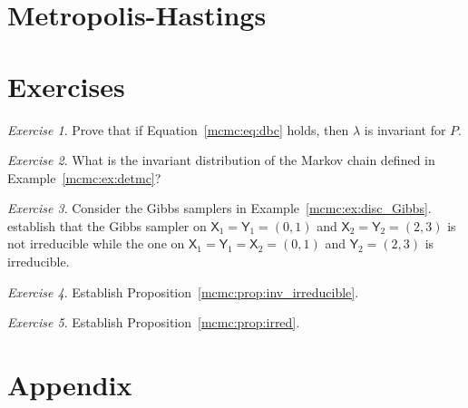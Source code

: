 \documentclass[12pt]{article}
\theoremstyle{plain}
\theoremstyle{definition}
\theoremstyle{remark}
\newtheorem{hw}{Exercise}[section]
\newcommand{\X}{\mathsf{X}}
\newcommand{\Y}{\mathsf{Y}}
\begin{document}
 
 


\section{Metropolis-Hastings}
\label{mcmc:sec:mh}


\section*{Exercises}
\begin{hw}
  \label{mcmc:hw:dbc}
Prove that if Equation~\ref{mcmc:eq:dbc} holds, then $\lambda$ is
invariant for $P$.
\end{hw}

\begin{hw}
What is the invariant distribution of the Markov chain defined in
Example~\ref{mcmc:ex:detmc}?
\end{hw}

\begin{hw}
  Consider the Gibbs samplers in Example~\ref{mcmc:ex:disc_Gibbs}.
  establish that the Gibbs sampler on $\X_1 = \Y_1 = (0,1)$ and
  $\X_2 = \Y_2 = (2,3)$ is not irreducible while the one on
  $\X_1 = \Y_1 = \X_2 = (0,1)$ and $ \Y_2 = (2,3)$ is irreducible.
\end{hw}

\begin{hw}
Establish Proposition~\ref{mcmc:prop:inv_irreducible}.
\end{hw}

\begin{hw}
  Establish Proposition~\ref{mcmc:prop:irred}.
\end{hw}




\newpage

\section*{Appendix}





\end{document}
